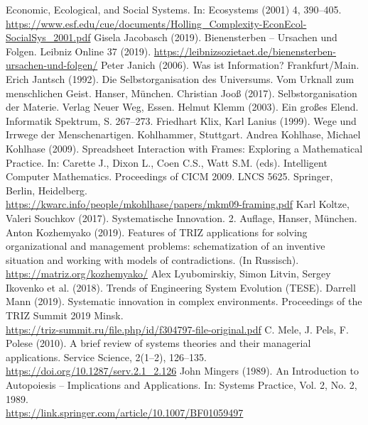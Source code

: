 \documentclass[11pt,a4paper]{article}
\begin{document}
\begin{thebibliography}{xxx}
  Economic, Ecological, and Social Systems. In: Ecosystems (2001) 4, 390–405.
  \url{https://www.esf.edu/cue/documents/Holling_Complexity-EconEcol-SocialSys_2001.pdf}
 Gisela Jacobasch (2019). Bienensterben -- Ursachen und
  Folgen.  Leibniz Online 37 (2019).
  \url{https://leibnizsozietaet.de/bienensterben-ursachen-und-folgen/}
 Peter Janich (2006). Was ist Information?
  Frankfurt/Main.
 Erich Jantsch (1992). Die Selbstorganisation des
  Universums. Vom Urknall zum menschlichen Geist.  Hanser, München.
 Christian Jooß (2017). Selbstorganisation der Materie.
  Verlag Neuer Weg, Essen.
 Helmut Klemm (2003). Ein großes Elend. Informatik
  Spektrum, S. 267--273.
 Friedhart Klix, Karl Lanius (1999). Wege und Irrwege der
  Menschenartigen.  Kohlhammer, Stuttgart.
 Andrea Kohlhase, Michael Kohlhase (2009). Spreadsheet
  Interaction with Frames: Exploring a Mathematical Practice. In: Carette J.,
  Dixon L., Coen C.S., Watt S.M. (eds). Intelligent Computer
  Mathematics. Proceedings of CICM 2009.  LNCS 5625. Springer, Berlin,
  Heidelberg.\\
  \url{https://kwarc.info/people/mkohlhase/papers/mkm09-framing.pdf}
 Karl Koltze, Valeri Souchkov (2017). Systematische
  Innovation.  2. Auf\-lage, Hanser, München.
 Anton Kozhemyako (2019). Features of TRIZ
  applications for solving organizational and management problems:
  schematization of an inventive situation and working with models of
  contradictions. (In Russisch).\\ \url{https://matriz.org/kozhemyako/}
 Alex Lyubomirskiy, Simon Litvin, Sergey Ikovenko et al.
  (2018).  Trends of Engineering System Evolution (TESE).
 Darrell Mann (2019).  Systematic innovation in complex
  environments. Proceedings of the TRIZ Summit 2019 Minsk.\\
  \url{https://triz-summit.ru/file.php/id/f304797-file-original.pdf} 
 C. Mele, J. Pels, F. Polese (2010). A brief review of
  systems theories and their managerial applications. Service Science,
  2(1--2), 126--135.\\ \url{https://doi.org/10.1287/serv.2.1_2.126} 
 John Mingers (1989). An Introduction to Autopoiesis --
  Implications and Applications. In: Systems Practice, Vol. 2, No. 2,
  1989.\\ \url{https://link.springer.com/article/10.1007/BF01059497}

\end{thebibliography}
\end{document}
